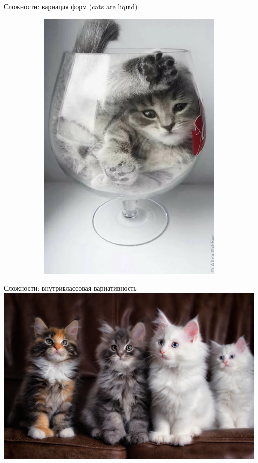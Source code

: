 \documentclass[aspectratio=169]{beamer}
\begin{document}
\begin{frame}{Сложности: вариация форм (cats are liquid)}
\begin{figure}
\begin{subfigure}[b]{.3\linewidth}
            \includegraphics[width=\linewidth]{graphs/fig10_2.jpg}
        \end{subfigure}
    \end{figure}
\end{frame}

\begin{frame}{Сложности: внутриклассовая вариативность}
    \centering
    \includegraphics[width=.71\linewidth]{graphs/fig11.jpg}
\end{frame}
\end{document}
